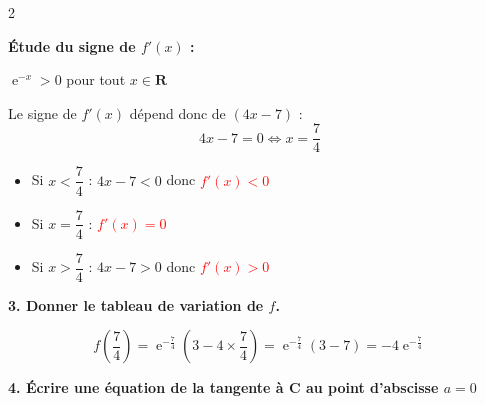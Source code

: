 \documentclass[11pt,a4paper]{article}
\DeclareMathOperator{\e}{e}
\begin{document}
\begin{tcolorbox}[colback=red!5!white,colframe=red!75!black]

\begin{multicols}{2}
    

{
\textbf{Étude du signe de $f'(x)$ :}

$\e^{-x} > 0$ pour tout $x \in \mathbf{R}$

Le signe de $f'(x)$ dépend donc de $(4x-7)$ :
\[
4x-7 = 0 \Longleftrightarrow x = \dfrac{7}{4}
\]

\vspace{2mm}

\begin{itemize}
    \item Si $x < \dfrac{7}{4}$ : $4x-7 < 0$ donc \textbf{\textcolor{red}{$f'(x) < 0$}}
    \item Si $x = \dfrac{7}{4}$ : \textbf{\textcolor{red}{$f'(x) = 0$}}
    \item Si $x > \dfrac{7}{4}$ : $4x-7 > 0$ donc \textbf{\textcolor{red}{$f'(x) > 0$}}
\end{itemize}
}
\end{multicols}
\end{tcolorbox}

\vspace{3mm}

\textbf{3. Donner le tableau de variation de $f$.}

\begin{tcolorbox}[colback=red!5!white,colframe=red!75!black]
{
\[
f\left(\dfrac{7}{4}\right) = \e^{-\frac{7}{4}}\left(3-4 \times \dfrac{7}{4}\right) = \e^{-\frac{7}{4}}(3-7) = -4\e^{-\frac{7}{4}}
\]



\begin{center}
\end{center}

}
\end{tcolorbox}

\vspace{3mm}

\textbf{4. Écrire une équation de la tangente à C au point d'abscisse $a=0$}
\end{document}

